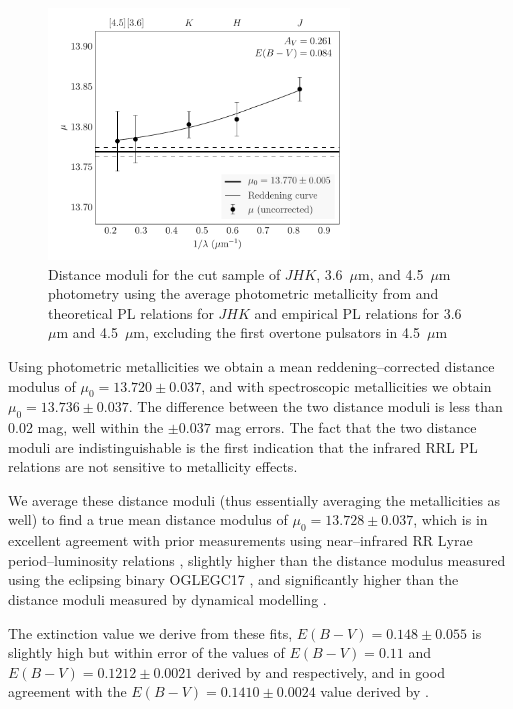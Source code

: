 \documentclass[a4paper,fleqn,usenatbib]{mnras}
\begin{document}
\begin{figure}
\begin{center}
\includegraphics[width=80mm]{final_plots/multiwavelength_distance_samestars_m4_4p5ab.pdf}
\caption{Distance moduli for the cut sample of $J\!H\!K$, 3.6~$\mu$m, and 4.5~$\mu$m photometry using the average photometric metallicity from \citet{2006ApJ...640L..43S} and theoretical PL relations for $J\!H\!K$ and empirical PL relations for 3.6~$\mu$m and 4.5~$\mu$m, excluding the first overtone pulsators in 4.5~$\mu$m}
\label{fig:omegaCen_dist_m4_4p5ab}
\end{center}
\end{figure}

Using photometric metallicities we obtain a mean reddening--corrected distance modulus of $\mu_0 = 13.720 \pm 0.037$, and with spectroscopic metallicities we obtain $\mu_0 = 13.736 \pm 0.037$.
The difference between the two distance moduli is less than 0.02 mag, well within the $\pm 0.037$ mag errors. The fact that the two distance moduli are indistinguishable is the first indication that the infrared RRL PL relations are not sensitive to metallicity effects.

We average these distance moduli (thus essentially averaging the metallicities as well) to find a true mean distance modulus of $\mu_0 = 13.728 \pm 0.037$, which is in excellent agreement with prior measurements using near--infrared RR Lyrae period--luminosity relations \citep{2006ApJ...652..362D}, slightly higher than the distance modulus measured using the eclipsing binary OGLEGC17 \citep{2001AJ....121.3089T}, and significantly higher than the distance moduli measured by dynamical modelling \citep{2006A&A...445..513V,
2013MNRAS.436.2598W}.

The extinction value we derive from these fits, $E(B-V) = 0.148 \pm 0.055$ is slightly high but within error of the values of $E(B-V) = 0.11$ and $E(B-V) = 0.1212 \pm 0.0021$ derived by \citet{2002ASPC..265...95L} and \citet{2011ApJ...737..103S} respectively, and in good agreement with the $E(B-V) = 0.1410 \pm 0.0024$ value derived by \citet{1998ApJ...500..525S}.
\end{document}
